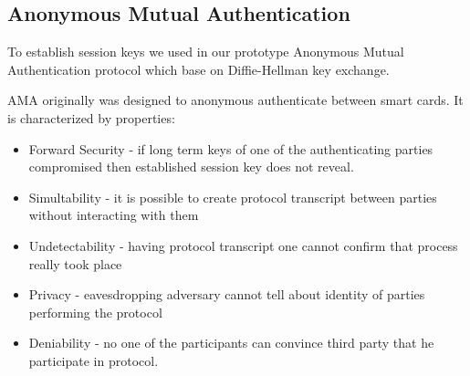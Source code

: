 \documentclass[11pt,titlepage]{article}
\theoremstyle{plain}
\begin{document}
\subsection{Anonymous Mutual Authentication}
To establish session keys we used in our prototype Anonymous Mutual Authentication protocol which base on Diffie-Hellman key exchange. 

\vspace{5mm}

AMA originally was designed to anonymous authenticate between smart cards. It is characterized by properties:
\begin{itemize}
\item Forward Security - if long term keys of one of the authenticating parties compromised then established session key does not reveal.
\item Simultability - it is possible to create protocol transcript between parties without interacting with them
\item Undetectability - having protocol transcript one cannot confirm that process really took place
\item Privacy - eavesdropping adversary cannot tell about identity of parties performing the protocol
\item Deniability - no one of the participants can convince third party that he participate in protocol.
\end{itemize}
\end{document}
